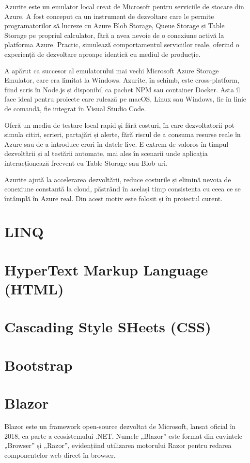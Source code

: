 Azurite este un emulator local creat de Microsoft pentru serviciile de stocare din Azure. A fost conceput ca un instrument de dezvoltare care le permite programatorilor să lucreze cu Azure Blob Storage, Queue Storage și Table Storage pe propriul calculator, fără a avea nevoie de o conexiune activă la platforma Azure. Practic, simulează comportamentul serviciilor reale, oferind o experiență de dezvoltare aproape identică cu mediul de producție. \parencite{azurite}

A apărut ca succesor al emulatorului mai vechi Microsoft Azure Storage Emulator, care era limitat la Windows. Azurite, în schimb, este cross-platform, fiind scris în Node.js și disponibil ca pachet NPM sau container Docker. Asta îl face ideal pentru proiecte care rulează pe macOS, Linux sau Windows, fie în linie de comandă, fie integrat în Visual Studio Code. \parencite{azurite}

Oferă un mediu de testare local rapid și fără costuri, în care dezvoltatorii pot simula citiri, scrieri, partajări și alerte, fără riscul de a consuma resurse reale în Azure sau de a introduce erori în datele live. E extrem de valoros în timpul dezvoltării și al testării automate, mai ales în scenarii unde aplicația interacționează frecvent cu Table Storage sau Blob-uri. \parencite{azurite}

Azurite ajută la accelerarea dezvoltării, reduce costurile și elimină nevoia de conexiune constantă la cloud, păstrând în același timp consistența cu ceea ce se întâmplă în Azure real. Din acest motiv este folosit și în proiectul curent.

\section{LINQ}
\section{HyperText Markup Language (HTML)}
\section{Cascading Style SHeets (CSS)}
\section{Bootstrap}
\section{Blazor}
Blazor este un framework open-source dezvoltat de Microsoft, lansat oficial în 2018, ca parte a ecosistemului .NET. Numele „Blazor” este format din cuvintele „Browser” și „Razor”, evidențiind utilizarea motorului Razor pentru redarea componentelor web direct în browser. \parencite{blazor}

